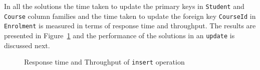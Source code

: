 In all the solutions the time taken to update the primary keys in
\texttt{Student} and \texttt{Course} column families and the time taken to
update the foreign key \texttt{CourseId} in \texttt{Enrolment} is measured
in terms of response time and throughput. The
results are presented in Figure~\ref{fr:update-result} and the performance of
the solutions in an \texttt{update} is discussed next.

	\begin{figure}[h] \label{fr:update-result}
		\centering
	\caption{Response time and Throughput of \texttt{insert} operation}
	\end{figure}
	
